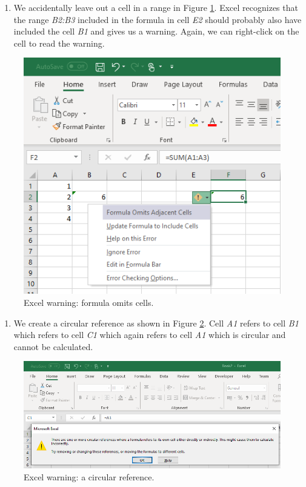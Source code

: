 \documentclass[]{book}
\providecommand{\tightlist}{%
  \setlength{\itemsep}{0pt}\setlength{\parskip}{0pt}}
\begin{document}
\begin{enumerate}
\def\labelenumi{\arabic{enumi}.}
\setcounter{enumi}{1}
\tightlist
\item
  We accidentally leave out a cell in a range in Figure \ref{fig:ex19}. Excel recognizes that the range \emph{B2:B3} included in the formula in cell \emph{E2} should probably also have included the cell \emph{B1} and gives us a warning. Again, we can right-click on the cell to read the warning.
\end{enumerate}

\begin{figure}

{\centering \includegraphics[width=0.75\linewidth]{_resources/chapter_excelbasic/w2} 

}

\caption{Excel warning: formula omits cells.}\label{fig:ex19}
\end{figure}

\begin{enumerate}
\def\labelenumi{\arabic{enumi}.}
\setcounter{enumi}{2}
\tightlist
\item
  We create a circular reference as shown in Figure \ref{fig:ex20}. Cell \emph{A1} refers to cell \emph{B1} which refers to cell \emph{C1} which again refers to cell \emph{A1} which is circular and cannot be calculated.
\end{enumerate}

\begin{figure}

{\centering \includegraphics[width=0.75\linewidth]{_resources/chapter_excelbasic/w3} 

}

\caption{Excel warning: a circular reference.}\label{fig:ex20}
\end{figure}
\end{document}

